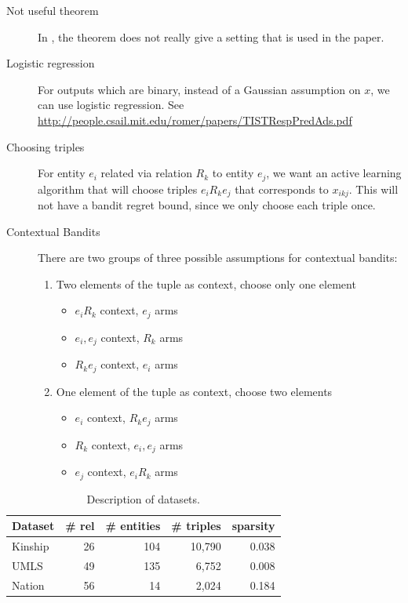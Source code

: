 \begin{description}
  \item[Not useful theorem] In \cite{kawale2015efficient}, the theorem does not really give
  a setting that is used in the paper.
  \item[Logistic regression] For outputs which are binary, instead of a Gaussian assumption on
  $x$, we can use logistic regression. See
   \url{http://people.csail.mit.edu/romer/papers/TISTRespPredAds.pdf}
  \item[Choosing triples] For entity $e_i$ related via relation $R_k$ to entity $e_j$, we want
  an active learning algorithm that will choose triples $e_i R_k e_j$ that corresponds to
  $x_{ikj}$. This will not have a bandit regret bound, since we only choose each triple once.
  \item[Contextual Bandits] There are two groups of three possible assumptions for contextual
  bandits:
  \begin{enumerate}
    \item Two elements of the tuple as context, choose only one element
    \begin{itemize}
      \item $e_iR_k$ context, $e_j$ arms
      \item $e_i, e_j$ context, $R_k$ arms
      \item $R_ke_j$ context, $e_i$ arms
    \end{itemize}
    \item One element of the tuple as context, choose two elements
    \begin{itemize}
      \item $e_i$ context, $R_k e_j$ arms
      \item $R_k$ context, $e_i, e_j$ arms
      \item $e_j$ context, $e_iR_k$ arms
    \end{itemize}
  \end{enumerate}
\end{description}

\begin{table}
\centering
\caption{\label{tbl:dataset}Description of datasets.}
\begin{tabular}{l | r | r | r | r}
Dataset &  \# rel & \# entities & \# triples & sparsity \\ \hline
Kinship & 26 & 104  & 10,790 & 0.038 \\
UMLS & 49 &135  & 6,752 & 0.008 \\
Nation & 56 & 14  & 2,024 & 0.184 \\
\end{tabular}
\end{table}


